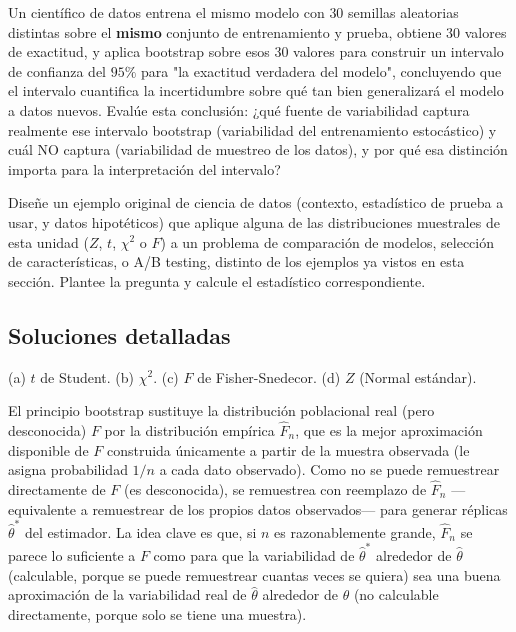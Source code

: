 \begin{problema}
	\label{prob:cf54ef8}
	Un científico de datos entrena el mismo modelo con $30$ semillas aleatorias distintas sobre el \textbf{mismo} conjunto de entrenamiento y prueba, obtiene $30$ valores de exactitud, y aplica bootstrap sobre esos $30$ valores para construir un intervalo de confianza del $95\%$ para "la exactitud verdadera del modelo", concluyendo que el intervalo cuantifica la incertidumbre sobre qué tan bien generalizará el modelo a datos nuevos. Evalúe esta conclusión: ¿qué fuente de variabilidad captura realmente ese intervalo bootstrap (variabilidad del entrenamiento estocástico) y cuál NO captura (variabilidad de muestreo de los datos), y por qué esa distinción importa para la interpretación del intervalo?
\end{problema}

\begin{problema}
	\label{prob:7d50e57}
	Diseñe un ejemplo original de ciencia de datos (contexto, estadístico de prueba a usar, y datos hipotéticos) que aplique alguna de las distribuciones muestrales de esta unidad ($Z$, $t$, $\chi^2$ o $F$) a un problema de comparación de modelos, selección de características, o A/B testing, distinto de los ejemplos ya vistos en esta sección. Plantee la pregunta y calcule el estadístico correspondiente.
\end{problema}

\subsection*{Soluciones detalladas}

\begin{solproblema}[prob:9f56f56]
	(a) $t$ de Student. (b) $\chi^2$. (c) $F$ de Fisher-Snedecor. (d) $Z$ (Normal estándar).
\end{solproblema}

\begin{solproblema}
	El principio bootstrap sustituye la distribución poblacional real (pero desconocida) $F$ por la distribución empírica $\hat F_n$, que es la mejor aproximación disponible de $F$ construida únicamente a partir de la muestra observada (le asigna probabilidad $1/n$ a cada dato observado). Como no se puede remuestrear directamente de $F$ (es desconocida), se remuestrea con reemplazo de $\hat F_n$ —equivalente a remuestrear de los propios datos observados— para generar réplicas $\hat\theta^*$ del estimador. La idea clave es que, si $n$ es razonablemente grande, $\hat F_n$ se parece lo suficiente a $F$ como para que la variabilidad de $\hat\theta^*$ alrededor de $\hat\theta$ (calculable, porque se puede remuestrear cuantas veces se quiera) sea una buena aproximación de la variabilidad real de $\hat\theta$ alrededor de $\theta$ (no calculable directamente, porque solo se tiene una muestra).
\end{solproblema}

